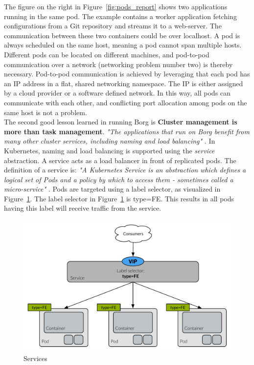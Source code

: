 \noindent
The figure on the right in Figure~\ref{fig:pods_report} shows two applications running in the same pod. The example contains a worker application fetching configurations from a Git repository and streams it to a web-server. The communication between these two containers could be over localhost. A pod is always scheduled on the same host, meaning a pod cannot span multiple hosts. Different pods can be located on different machines, and pod-to-pod communication over a network (networking problem number two) is thereby necessary. Pod-to-pod communication is achieved by leveraging that each pod has an IP address in a flat, shared networking namespace. The IP is either assigned by a cloud provider or a software defined network. In this way, all pods can communicate with each other, and conflicting port allocation among pods on the same host is not a problem.
 \\



\noindent
The second good lesson learned in running Borg is \textbf{Cluster management is more than task management}. \textit{"The applications that run on Borg benefit from many other cluster services, including naming and load balancing"} \cite[p. 14]{verma2015borg}. In Kubernetes, naming and load balancing is supported using the \textit{service} abstraction. A service acts as a load balancer in front of replicated pods. The definition of a service is: \textit{"A Kubernetes Service is an abstraction which defines a logical set of Pods and a policy by which to access them - sometimes called a micro-service"} \cite{kubernetesio}. Pods are targeted using a label selector, as visualized in Figure~\ref{fig:services_report}. The label selector in Figure~\ref{fig:services_report} is type=FE. This results in all pods having this label will receive traffic from the service.

\begin{figure}[H]
    \centering
    \includegraphics[width=14cm]{figures/kubernetes/service}
    \caption{Services}
    \label{fig:services_report}
\end{figure}

